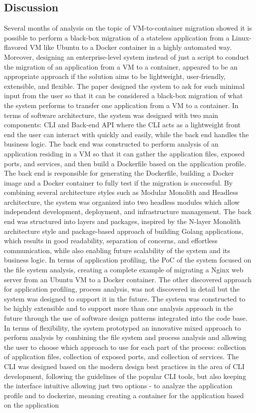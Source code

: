 \documentclass{article}
\begin{document}
\begin{multicols}{2}
\section{Discussion}
Several months of analysis on the topic of VM-to-container migration showed it is possible to perform a black-box migration of a stateless application from a Linux-flavored VM like Ubuntu to a Docker container in a highly automated way. Moreover, designing an enterprise-level system instead of just a script to conduct the migration of an application from a VM to a container, appeared to be an appropriate approach if the solution aims to be lightweight, user-friendly, extensible, and flexible. The paper designed the system to ask for such minimal input from the user so that it can be considered a black-box migration of what the system performs to transfer one application from a VM to a container. In terms of software architecture, the system was designed with two main components: CLI and Back-end API where the CLI acts as a lightweight front end the user can interact with quickly and easily, while the back end handles the business logic. The back end was constructed to perform analysis of an application residing in a VM so that it can gather the application files, exposed ports, and services, and then build a Dockerfile based on the application profile. The back end is responsible for generating the Dockerfile, building a Docker image and a Docker container to fully test if the migration is successful. By combining several architecture styles such as Modular Monolith and Headless architecture, the system was organized into two headless modules which allow independent development, deployment, and infrastructure management. The back end was structured into layers and packages, inspired by the N-layer Monolith architecture style and package-based approach of building Golang applications, which results in good readability, separation of concerns, and effortless communication, while also enabling future scalability of the system and its business logic. In terms of application profiling, the PoC of the system focused on the file system analysis, creating a complete example of migrating a Nginx web server from an Ubuntu VM to a Docker container. The other discovered approach for application profiling, process analysis, was not discovered in detail but the system was designed to support it in the future. The system was constructed to be highly extensible and to support more than one analysis approach in the future through the use of software design patterns integrated into the code base. In terms of flexibility, the system prototyped an innovative mixed approach to perform analysis by combining the file system and process analysis and allowing the user to choose which approach to use for each part of the process: collection of application files, collection of exposed ports, and collection of services. The CLI was designed based on the modern design best practices in the area of CLI development, following the guidelines of the popular CLI tools, but also keeping the interface intuitive allowing just two options - to analyze the application profile and to dockerize, meaning creating a container for the application based on the application 
\end{multicols}
\end{document}
